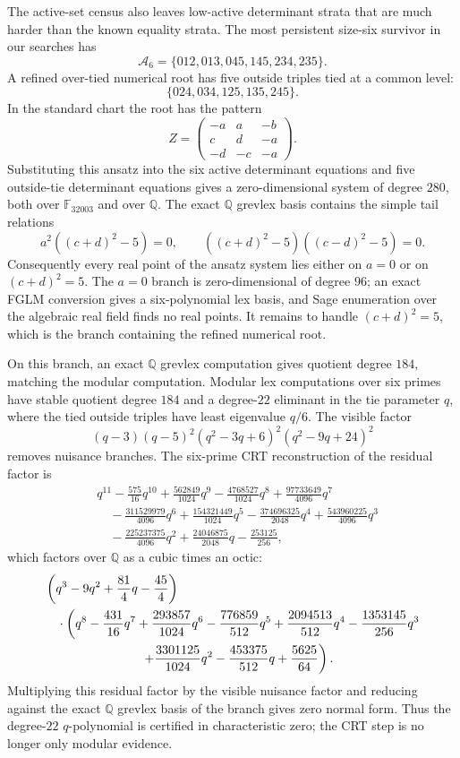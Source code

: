 \documentclass[11pt]{article}
\numberwithin{equation}{section}
\theoremstyle{definition}
\newcommand{\cA}{\mathcal A}
\begin{document}
The active-set census also leaves low-active determinant strata that are much
harder than the known equality strata.  The most persistent size-six survivor in
our searches has
\[
  \cA_6=\{012,013,045,145,234,235\}.
\]
A refined over-tied numerical root has five outside triples tied at a common
level:
\[
  \{024,034,125,135,245\}.
\]
In the standard chart the root has the pattern
\[
Z=
\begin{pmatrix}
-a&a&-b\\
c&d&-a\\
-d&-c&-a
\end{pmatrix}.
\]
Substituting this ansatz into the six active determinant equations and five
outside-tie determinant equations gives a zero-dimensional system of degree
\(280\), both over \(\mathbb F_{32003}\) and over \(\mathbb Q\).  The exact
\(\mathbb Q\) grevlex basis contains the simple tail relations
\[
  a^2((c+d)^2-5)=0,\qquad
  ((c+d)^2-5)((c-d)^2-5)=0.
\]
Consequently every real point of the ansatz system lies either on \(a=0\) or
on \((c+d)^2=5\).  The \(a=0\) branch is zero-dimensional of degree \(96\);
an exact FGLM conversion gives a six-polynomial lex basis, and Sage
enumeration over the algebraic real field finds no real points.  It remains to
handle \((c+d)^2=5\), which is the branch containing the refined numerical
root.

On this branch, an exact \(\mathbb Q\) grevlex computation gives quotient
degree \(184\), matching the modular computation.  Modular lex computations over
six primes have stable quotient degree \(184\) and a degree-\(22\) eliminant in
the tie parameter \(q\), where the tied outside triples have least eigenvalue
\(q/6\).  The visible factor
\[
  (q-3)(q-5)^2(q^2-3q+6)^2(q^2-9q+24)^2
\]
removes nuisance branches.  The six-prime CRT reconstruction of the residual
factor is
\[
\begin{split}
&q^{11}-\frac{575}{16}q^{10}+\frac{562849}{1024}q^9
-\frac{4768527}{1024}q^8+\frac{97733649}{4096}q^7\\
&\quad-\frac{311529979}{4096}q^6+\frac{154321449}{1024}q^5
-\frac{374696325}{2048}q^4+\frac{543960225}{4096}q^3\\
&\quad-\frac{225237375}{4096}q^2+\frac{24046875}{2048}q
-\frac{253125}{256},
\end{split}
\]
which factors over \(\mathbb Q\) as a cubic times an octic:
\[
\begin{split}
&\left(q^3-9q^2+\frac{81}{4}q-\frac{45}{4}\right)\\
&\quad\cdot
\left(q^8-\frac{431}{16}q^7+\frac{293857}{1024}q^6
-\frac{776859}{512}q^5+\frac{2094513}{512}q^4
-\frac{1353145}{256}q^3\right.\\
&\hspace{27mm}\left.
+\frac{3301125}{1024}q^2-\frac{453375}{512}q
+\frac{5625}{64}\right).
\end{split}
\]
Multiplying this residual factor by the visible nuisance factor and reducing
against the exact \(\mathbb Q\) grevlex basis of the branch gives zero normal
form.  Thus the degree-\(22\) \(q\)-polynomial is certified in characteristic
zero; the CRT step is no longer only modular evidence.
\end{document}
